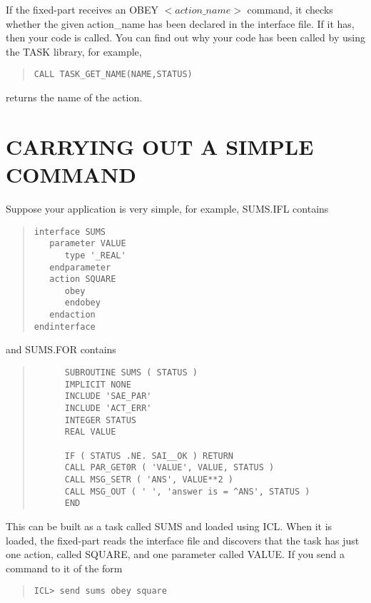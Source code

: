 If the fixed-part receives an OBEY $<action\_name>$ command, it checks 
whether the given action\_name has been declared in the interface file. 
If it has, then your code is called. You can find out why your code has 
been called by using the TASK library, for example, 
\small \begin{quote} \begin{verbatim}
CALL TASK_GET_NAME(NAME,STATUS)
\end{verbatim} \end{quote} \normalsize
returns the name of the action.

\section{CARRYING OUT A SIMPLE COMMAND}

Suppose your application is very simple, for example, SUMS.IFL contains 

\small \begin{quote} \begin{verbatim}
interface SUMS
   parameter VALUE
      type '_REAL'
   endparameter
   action SQUARE
      obey
      endobey
   endaction
endinterface
\end{verbatim} \end{quote} \normalsize

and SUMS.FOR contains

\small \begin{quote} \begin{verbatim}
      SUBROUTINE SUMS ( STATUS )
      IMPLICIT NONE
      INCLUDE 'SAE_PAR'
      INCLUDE 'ACT_ERR'
      INTEGER STATUS
      REAL VALUE

      IF ( STATUS .NE. SAI__OK ) RETURN
      CALL PAR_GET0R ( 'VALUE', VALUE, STATUS )
      CALL MSG_SETR ( 'ANS', VALUE**2 )
      CALL MSG_OUT ( ' ', 'answer is = ^ANS', STATUS )
      END
\end{verbatim} \end{quote} \normalsize

This can be built as a task called SUMS and loaded using ICL. When it is 
loaded, the fixed-part reads the interface file and discovers that the 
task has just one action, called SQUARE, and one parameter called VALUE. 
If you send a command to it of the form

\small \begin{quote} \begin{verbatim}
ICL> send sums obey square
\end{verbatim} \end{quote} \normalsize

